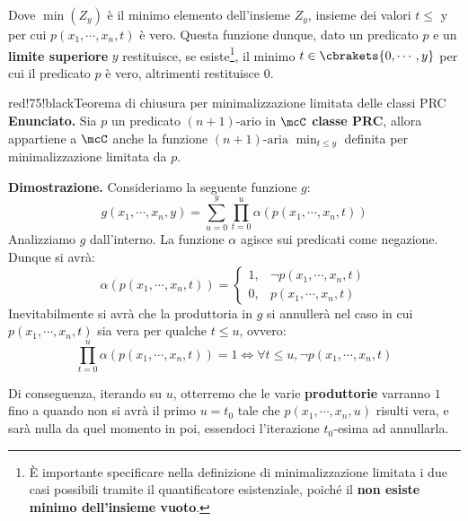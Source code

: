 Dove \(\min(Z_y)\) è il minimo elemento dell'insieme \(Z_y\), insieme dei valori \(t\leq\) y per cui \(p(x_1,\cdots,x_n,t)\) è vero.
Questa funzione dunque, dato un predicato \(p\) e un \textbf{limite superiore} \(y\) restituisce, se esiste\footnote{È importante specificare nella definizione di minimalizzazione limitata i due casi possibili tramite il quantificatore esistenziale, poiché il \textbf{non esiste minimo dell'insieme vuoto}.}, il minimo \(t \in \cbrakets{0, \cdots, y}\) per cui il predicato \(p\) è vero, altrimenti restituisce \(0\).

\newpage

\begin{halfframedbox} {red!75!black}{Teorema di chiusura per minimalizzazione limitata delle classi PRC}\label{Teorema di chiusura minimalizzazione limitata delle classi PRC}
  \textbf{Enunciato. } Sia \(p\) un predicato \((n+1)\text{-ario}\) in \(\mcC\) \textbf{classe PRC}, allora appartiene a \(\mcC\) anche la funzione \((n+1)\text{-aria}\) \(\min_{t\leq y}\) definita per minimalizzazione limitata da \(p\).

  \begin{center}
    \textcolor{red!75!black}{\hdashrule[0.5ex]{18cm}{1pt}{3mm 3pt 1mm 2pt}}
  \end{center}

  \textbf{Dimostrazione. } Consideriamo la seguente funzione \(g\):
  \begin{equation}
    g(x_1,\cdots,x_n,y)=\sum_{u=0}^y\prod_{t=0}^{u}\alpha(p(x_1,\cdots,x_n,t))
  \end{equation}
  Analizziamo \(g\) dall'interno. La funzione \(\alpha\) agisce sui predicati come negazione. Dunque si avrà:
  \begin{equation}
    \alpha(p(x_1,\cdots,x_n,t))= \begin{cases}
                                1, & \neg p(x_1,\cdots,x_n,t)\\
                                0, & p(x_1,\cdots,x_n,t)
                              \end{cases}
  \end{equation}
  Inevitabilmente si avrà che la produttoria in \(g\) si annullerà nel caso in cui \(p(x_1,\cdots,x_n,t)\) sia vera per qualche \(t\leq u\), ovvero:
  \begin{equation}
    \prod_{t=0}^{u}\alpha(p(x_1,\cdots,x_n,t))=1\iff\forall t \leq u, \neg p(x_1,\cdots,x_n,t)
  \end{equation}

  Di conseguenza, iterando su \(u\), otterremo che le varie \textbf{produttorie} varranno \(1\) fino a quando non si avrà il primo \(u=t_0\) tale che \(p(x_1,\cdots,x_n,u)\) risulti vera, e sarà nulla da quel momento in poi, essendoci l'iterazione \(t_0\)-esima ad annullarla.


\end{halfframedbox}
